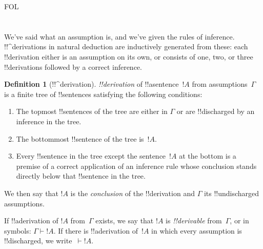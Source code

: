 \documentclass[10pt,a4paper]{article}
\theoremstyle{plain}
\theoremstyle{definition}
\newtheorem{defn}[thm]{Definition}
\theoremstyle{remark}
\newenvironment{explain}{}{}
\newcommand*{\olfileid}[3]{}
\newcommand*{\olsection}[1]{\section*{#1}}
\providecommand{\Proves}{\mathrel{\vdash}}
\providecommand{\iftag}[1]{#1}
\begin{document}



\iftag{FOL}
      {\olfileid{fol}{ntd}{der}}
      {\olfileid{pl}{ntd}{der}}

\olsection{}

\begin{explain}
We've said what an assumption is, and we've given the rules of
inference.  !!^{derivation}s in natural deduction are inductively
generated from these: each !!{derivation} either is an assumption
on its own, or consists of one, two, or three !!{derivation}s followed
by a correct inference.
\end{explain}

\begin{defn}[!!^{derivation}]
 \emph{!!{derivation}} of !!a{sentence}~$!A$ from
assumptions~$\Gamma$ is a finite tree of !!{sentence}s satisfying the
following conditions:
\begin{enumerate}
\item The topmost !!{sentence}s of the tree are either in $\Gamma$ or
  are !!{discharged} by an inference in the tree.
\item The bottommost !!{sentence} of the tree is~$!A$.
\item Every !!{sentence} in the tree except the sentence~$!A$ at
  the bottom is a premise of a correct application of an inference
  rule whose conclusion stands directly below that !!{sentence} in the
  tree.
\end{enumerate}
We then say that $!A$ is the \emph{conclusion} of the !!{derivation}
and $\Gamma$ its !!{undischarged} assumptions.

If !!a{derivation} of $!A$ from~$\Gamma$ exists, we say that $!A$ is
\emph{!!{derivable}} from~$\Gamma$, or in symbols: $\Gamma \Proves
!A$. If there is !!a{derivation} of~$!A$ in which every assumption is
!!{discharged}, we write~$\Proves !A$.
\end{defn}
\end{document}

